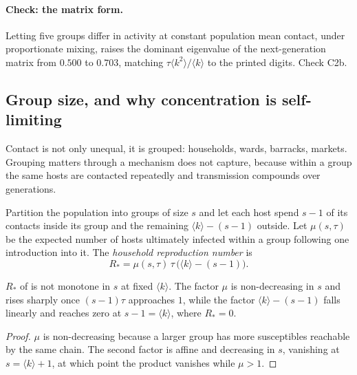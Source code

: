 \paragraph{Check: the matrix form.} \lnkC{} Letting five groups differ in
activity at constant population mean contact, under proportionate mixing,
raises the dominant eigenvalue of the next-generation matrix from $0.500$
to $0.703$, matching $\tau\langle k^2\rangle/\langle k\rangle$ to the
printed digits. Check C2b.

\subsection{Group size, and why concentration is self-limiting}

Contact is not only unequal, it is grouped: households, wards, barracks,
markets. Grouping matters through a mechanism  does not
capture, because within a group the same hosts are contacted repeatedly and
transmission compounds over generations.

\begin{definition}
\label{sm:def-rstar}
Partition the population into groups of size $s$ and let each host spend
$s-1$ of its contacts inside its group and the remaining
$\langle k\rangle-(s-1)$ outside. Let $\mu(s,\tau)$ be the expected number
of hosts ultimately infected within a group following one introduction into
it. The \emph{household reproduction number} is
\begin{equation}
R_*=\mu(s,\tau)\,\tau\,\bigl(\langle k\rangle-(s-1)\bigr).
\label{sm:eq-rstar}
\end{equation}
\end{definition}

\begin{proposition}
\label{sm:prop-nonmonotone}
\lnkD{} $R_*$ of  is not monotone in $s$ at fixed
$\langle k\rangle$. The factor $\mu$ is non-decreasing in $s$ and rises
sharply once $(s-1)\tau$ approaches $1$, while the factor
$\langle k\rangle-(s-1)$ falls linearly and reaches zero at
$s-1=\langle k\rangle$, where $R_*=0$.
\end{proposition}

\begin{proof}
$\mu$ is non-decreasing because a larger group has more susceptibles
reachable by the same chain. The second factor is affine and decreasing in
$s$, vanishing at $s=\langle k\rangle+1$, at which point the product
vanishes while $\mu>1$.
\end{proof}

